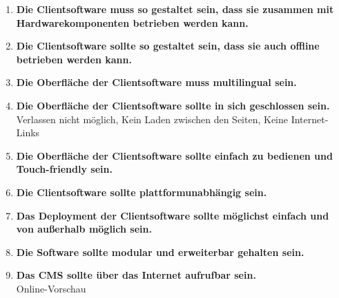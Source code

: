 \begin{enumerate}[label=\textbf{NFA\arabic*}]
	\item\label{nfa1} \textbf{Die Clientsoftware muss so gestaltet sein, dass sie zusammen mit Hardwarekomponenten 
  betrieben werden kann.}
	\item\label{nfa2} \textbf{Die Clientsoftware sollte so gestaltet sein, dass sie auch offline 
  betrieben werden kann.} 
  \item\label{nfa3} \textbf{Die Oberfläche der Clientsoftware muss multilingual sein.}
  \item\label{nfa4} \textbf{Die Oberfläche der Clientsoftware sollte in sich geschlossen sein.}\\
  Verlassen nicht möglich, Kein Laden zwischen den Seiten, Keine Internet-Links
  \item\label{nfa5} \textbf{Die Oberfläche der Clientsoftware sollte einfach zu bedienen und Touch-friendly sein.}
  \item\label{nfa6} \textbf{Die Clientsoftware sollte plattformunabhängig sein.}
  \item\label{nfa7} \textbf{Das Deployment der Clientsoftware sollte möglichst einfach und von außerhalb möglich sein.}
  \item\label{nfa8} \textbf{Die Software sollte modular und erweiterbar gehalten sein.}
  \item\label{nfa9} \textbf{Das CMS sollte über das Internet aufrufbar sein.}\\
  Online-Vorschau
\end{enumerate}

